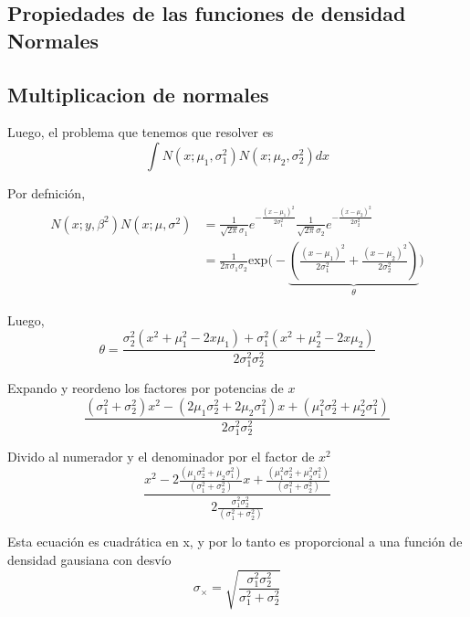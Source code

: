 \documentclass[article]{jss}
\begin{document}
\begin{appendix}
\section{Propiedades de las funciones de densidad Normales}

\subsection{Multiplicacion de normales}\label{multiplicacion_normales}

Luego, el problema que tenemos que resolver es
\begin{equation}
 \int N(x;\mu_1,\sigma_1^2)N(x;\mu_2,\sigma_2^2) dx
\end{equation}

Por defnici\'on,
\begin{equation}
\begin{split}
 N(x;y,\beta^2)N(x;\mu,\sigma^2) & = \frac{1}{\sqrt{2\pi}\sigma_1}e^{-\frac{(x-\mu_1)^2}{2\sigma_1^2}} \frac{1}{\sqrt{2\pi}\sigma_2}e^{-\frac{(x-\mu_2)^2}{2\sigma_2^2}}  \\
 & = \frac{1}{2\pi\sigma_1\sigma_2}\text{exp}\Bigg(-\underbrace{\left( \frac{(x-\mu_1)^2}{2\sigma_1^2} + \frac{(x-\mu_2)^2}{2\sigma_2^2} \right)}_{\theta} \Bigg)
\end{split}
\end{equation}

Luego,
\begin{equation}
 \theta = \frac{\sigma_2^2(x^2 + \mu_1^2 - 2x\mu_1) + \sigma_1^2(x^2 + \mu_2^2 - 2x\mu_2) }{2\sigma_1^2\sigma_2^2}
\end{equation}

Expando y reordeno los factores por potencias de $x$
\begin{equation}
 \frac{(\sigma_1^2 + \sigma_2^2) x^2 - (2\mu_1\sigma_2^2 + 2\mu_2\sigma_1^2) x + (\mu_1^2\sigma_2^2 + \mu_2^2\sigma_1^2)}{2\sigma_1^2\sigma_2^2}
\end{equation}

Divido al numerador y el denominador por el factor de $x^2$
\begin{equation}
 \frac{x^2 - 2\frac{(\mu_1\sigma_2^2 + \mu_2\sigma_1^2)}{(\sigma_1^2 + \sigma_2^2) } x + \frac{(\mu_1^2\sigma_2^2 + \mu_2^2\sigma_1^2)}{(\sigma_1^2 + \sigma_2^2) }}{2\frac{\sigma_1^2\sigma_2^2}{(\sigma_1^2 + \sigma_2^2)}}
\end{equation}

Esta ecuaci\'on es cuadr\'atica en x, y por lo tanto es proporcional a una funci\'on de densidad gausiana con desv\'io
\begin{equation}
\sigma_{\times} = \sqrt{\frac{\sigma_1^2\sigma_2^2}{\sigma_1^2+\sigma_2^2}}
\end{equation}


\end{appendix}
\end{document}
